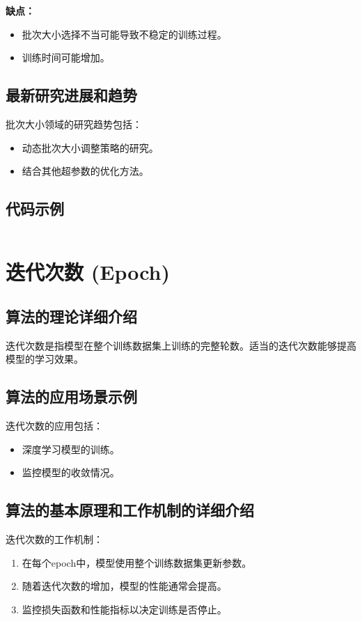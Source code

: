 \textbf{缺点：}
\begin{itemize}
    \item 批次大小选择不当可能导致不稳定的训练过程。
    \item 训练时间可能增加。
\end{itemize}

\subsection*{最新研究进展和趋势}
批次大小领域的研究趋势包括：
\begin{itemize}
    \item 动态批次大小调整策略的研究。
    \item 结合其他超参数的优化方法。
\end{itemize}
\subsection*{代码示例}
\begin{lstlisting}

\end{lstlisting}


\section{迭代次数 (Epoch)}
\subsection*{算法的理论详细介绍}
迭代次数是指模型在整个训练数据集上训练的完整轮数。适当的迭代次数能够提高模型的学习效果。

\subsection*{算法的应用场景示例}
迭代次数的应用包括：
\begin{itemize}
    \item 深度学习模型的训练。
    \item 监控模型的收敛情况。
\end{itemize}

\subsection*{算法的基本原理和工作机制的详细介绍}
迭代次数的工作机制：
\begin{enumerate}
    \item 在每个epoch中，模型使用整个训练数据集更新参数。
    \item 随着迭代次数的增加，模型的性能通常会提高。
    \item 监控损失函数和性能指标以决定训练是否停止。
\end{enumerate}

